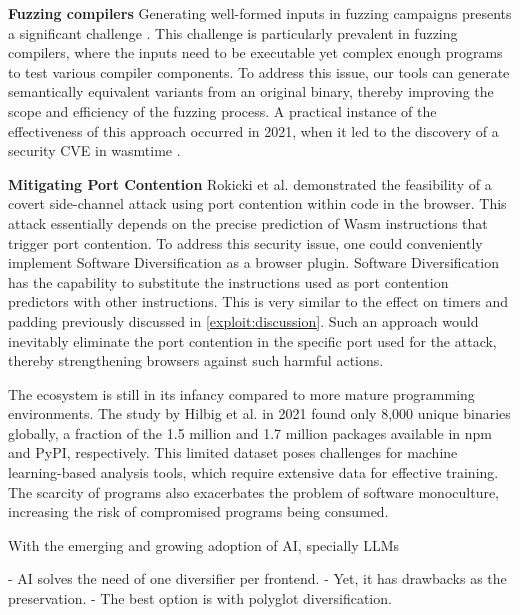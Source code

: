 \textbf{Fuzzing \Wasm compilers}
Generating well-formed inputs in fuzzing campaigns presents a significant challenge \cite{7958599}. 
This challenge is particularly prevalent in fuzzing compilers, where the inputs need to be executable yet complex enough programs to test various compiler components. 
To address this issue, our tools can generate semantically equivalent variants from an original \wasm binary, thereby improving the scope and efficiency of the fuzzing process. 
A practical instance of the effectiveness of this approach occurred in 2021, when it led to the discovery of a security CVE in wasmtime \cite{CVE}.



\textbf{Mitigating Port Contention}
Rokicki et al. \cite{10.1145/3488932.3517411} demonstrated the feasibility of a covert side-channel attack using port contention within \Wasm code in the browser. 
This attack essentially depends on the precise prediction of Wasm instructions that trigger port contention.
To address this security issue, one could conveniently implement Software Diversification as a browser plugin. 
Software Diversification has the capability to substitute the \wasm instructions used as port contention predictors with other instructions. 
This is very similar to the effect on timers and padding previously discussed in \autoref{exploit:discussion}.
Such an approach would inevitably eliminate the port contention in the specific port used for the attack, thereby strengthening browsers against such harmful actions.



 The \Wasm ecosystem is still in its infancy compared to more mature programming environments. 
The study by Hilbig et al. in 2021 found only 8,000 unique \Wasm binaries globally\cite{Hilbig2021AnES}, a fraction of the 1.5 million and 1.7 million packages available in npm and PyPI, respectively. 
This limited dataset poses challenges for machine learning-based analysis tools, which require extensive data for effective training. 
The scarcity of \Wasm programs also exacerbates the problem of software monoculture, increasing the risk of compromised \Wasm programs being consumed\cite{usenixWasm2020}. 


With the emerging and growing adoption of AI, specially LLMs

- AI solves the need of one diversifier per frontend.
- Yet, it has drawbacks as the preservation.
- The best option is with polyglot diversification.

